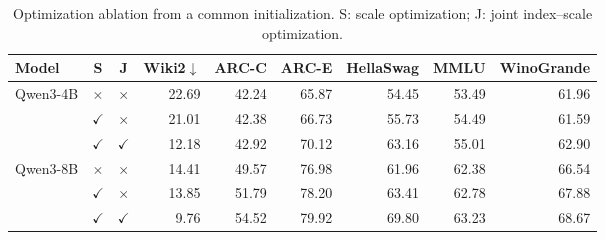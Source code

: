 \begin{table}[t]\centering\small
\caption{Optimization ablation from a common initialization. S: scale optimization; J: joint index--scale optimization.}
\label{tab:ablation-v20}
\begin{tabular}{lccrrrrrr}\toprule
Model & S & J & Wiki2$\downarrow$ & ARC-C & ARC-E & HellaSwag & MMLU & WinoGrande\\\midrule
Qwen3-4B & $\times$ & $\times$ & 22.69 & 42.24 & 65.87 & 54.45 & 53.49 & 61.96\\
 & $\checkmark$ & $\times$ & 21.01 & 42.38 & 66.73 & 55.73 & 54.49 & 61.59\\
 & $\checkmark$ & $\checkmark$ & 12.18 & 42.92 & 70.12 & 63.16 & 55.01 & 62.90\\\midrule
Qwen3-8B & $\times$ & $\times$ & 14.41 & 49.57 & 76.98 & 61.96 & 62.38 & 66.54\\
 & $\checkmark$ & $\times$ & 13.85 & 51.79 & 78.20 & 63.41 & 62.78 & 67.88\\
 & $\checkmark$ & $\checkmark$ & 9.76 & 54.52 & 79.92 & 69.80 & 63.23 & 68.67\\\bottomrule
\end{tabular}\end{table}
